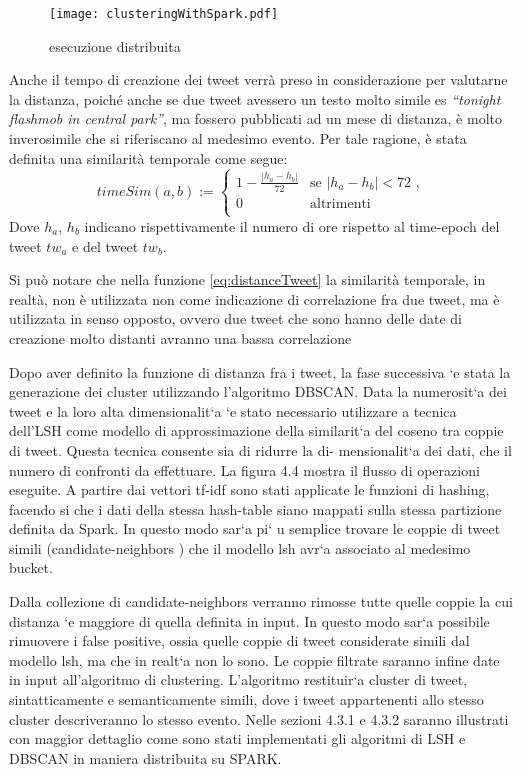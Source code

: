  \begin{figure}[h]
    \centering
    \texttt{[image: clusteringWithSpark.pdf]}
    \caption{esecuzione distribuita}
    \label{fig:clusteringWithSpark}
\end{figure}  

 
 Anche il tempo di creazione dei tweet verrà preso in considerazione per valutarne la distanza, poiché anche se due tweet avessero un testo molto simile es \emph{“tonight  flashmob in central park”}, ma fossero pubblicati ad un mese di distanza, è molto inverosimile che si riferiscano al medesimo evento. Per tale ragione, è stata definita una similarità temporale come segue:
\begin{equation} 
\label{eq:timeSim}
timeSim(a,b):=\begin{cases}
1-\frac{|h_a-h_b|}{72} & \text{se $|h_a-h_b|<72 $  ,}\\
0 & \text{altrimenti}\\
\end{cases}
\end{equation}
Dove $h_a$, $h_b$ indicano rispettivamente il numero di ore rispetto al time-epoch del tweet $tw_a$ e del tweet $tw_b$.

Si può notare che nella funzione \ref{eq:distanceTweet} la similarità  temporale, in realtà, non  è
utilizzata non come indicazione di correlazione fra due tweet, ma è utilizzata
in senso opposto, ovvero due tweet che sono hanno delle date di creazione molto distanti avranno una bassa correlazione

Dopo aver definito la funzione di distanza fra i tweet, la fase successiva `e
stata la generazione dei cluster utilizzando l’algoritmo DBSCAN. Data la
numerosit`a dei tweet e la loro alta dimensionalit`a `e stato necessario utilizzare 
a tecnica dell’LSH come modello di approssimazione della similarit`a
del coseno tra coppie di tweet. Questa tecnica consente sia di ridurre la di-
mensionalit`a dei dati, che il numero di confronti da effettuare. La figura 4.4
mostra il flusso di operazioni eseguite. A partire dai vettori tf-idf sono stati
applicate le funzioni di hashing, facendo si che i dati della stessa hash-table
siano mappati sulla stessa partizione definita da Spark. In questo modo sar`a
pi`
u semplice trovare le coppie di tweet simili (candidate-neighbors ) che il
modello lsh avr`a associato al medesimo bucket.

Dalla collezione di candidate-neighbors verranno rimosse tutte quelle coppie
la cui distanza `e maggiore di quella definita in input. In questo modo sar`a
possibile rimuovere i false positive, ossia quelle coppie di tweet considerate
simili dal modello lsh, ma che in realt`a non lo sono.
Le coppie filtrate saranno infine date in input all’algoritmo di clustering.
L’algoritmo restituir`a cluster di tweet, sintatticamente e semanticamente
simili, dove i tweet appartenenti allo stesso cluster descriveranno lo stesso
evento.
Nelle sezioni 4.3.1 e 4.3.2 saranno illustrati con maggior dettaglio come sono stati implementati gli algoritmi di LSH e DBSCAN in maniera distribuita su
SPARK.

